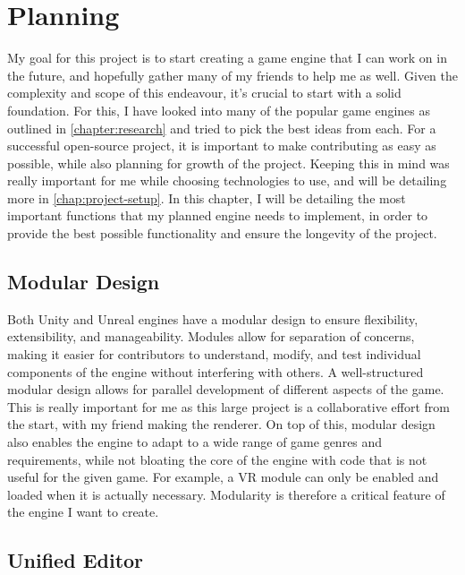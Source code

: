 \chapter{Planning}\label{chapter:planning}



My goal for this project is to start creating a game engine that I can work on in the future, and hopefully gather many of my friends to help me as well.
Given the complexity and scope of this endeavour, it's crucial to start with a solid foundation.
For this, I have looked into many of the popular game engines as outlined in \autoref{chapter:research} and tried to pick the best ideas from each.
For a successful open-source project, it is important to make contributing as easy as possible, while also planning for growth of the project. Keeping this in mind was really important for me while choosing technologies to use, and will be detailing more in \autoref{chap:project-setup}. In this chapter, I will be detailing the most important functions that my planned engine needs to implement, in order to provide the best possible functionality and ensure the longevity of the project.


\section{Modular Design}

Both Unity and Unreal engines have a modular design to ensure flexibility, extensibility, and manageability. Modules allow for separation of concerns, making it easier for contributors to understand, modify, and test individual components of the engine without interfering with others.
A well-structured modular design allows for parallel development of different aspects of the game. This is really important for me as this large project is a collaborative effort from the start, with my friend making the renderer.
On top of this, modular design also enables the engine to adapt to a wide range of game genres and requirements, while not bloating the core of the engine with code that is not useful for the given game. For example, a VR module can only be enabled and loaded when it is actually necessary. Modularity is therefore a critical feature of the engine I want to create.


\section{Unified Editor}

